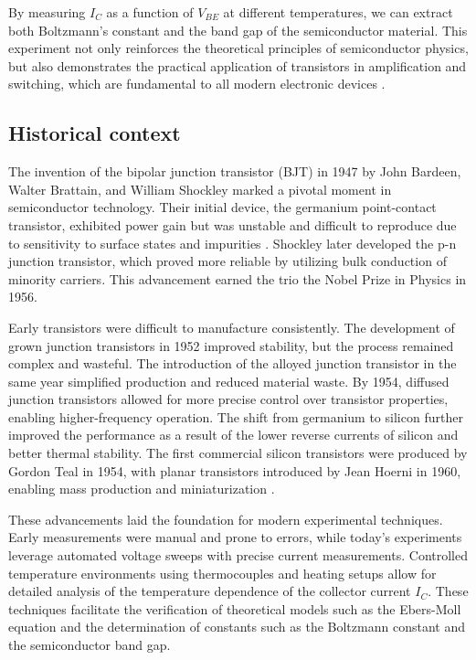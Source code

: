 \documentclass[12pt,letterpaper,twocolumn]{article}
\begin{document}
By measuring \( I_C \) as a function of \( V_{BE} \) at different temperatures, we can extract both Boltzmann’s constant and the band gap of the semiconductor material. This experiment not only reinforces the theoretical principles of semiconductor physics, but also demonstrates the practical application of transistors in amplification and switching, which are fundamental to all modern electronic devices \cite{Thornton}.


\subsection{Historical context}

The invention of the bipolar junction transistor (BJT) in 1947 by John Bardeen, Walter Brattain, and William Shockley marked a pivotal moment in semiconductor technology. Their initial device, the germanium point-contact transistor, exhibited power gain but was unstable and difficult to reproduce due to sensitivity to surface states and impurities \cite{Lukasiak}. Shockley later developed the p-n junction transistor, which proved more reliable by utilizing bulk conduction of minority carriers. This advancement earned the trio the Nobel Prize in Physics in 1956.

Early transistors were difficult to manufacture consistently. The development of grown junction transistors in 1952 improved stability, but the process remained complex and wasteful. The introduction of the alloyed junction transistor in the same year simplified production and reduced material waste. By 1954, diffused junction transistors allowed for more precise control over transistor properties, enabling higher-frequency operation. The shift from germanium to silicon further improved the performance as a result of the lower reverse currents of silicon and better thermal stability. The first commercial silicon transistors were produced by Gordon Teal in 1954, with planar transistors introduced by Jean Hoerni in 1960, enabling mass production and miniaturization \cite{Lukasiak}.

These advancements laid the foundation for modern experimental techniques. Early measurements were manual and prone to errors, while today's experiments leverage automated voltage sweeps with precise current measurements. Controlled temperature environments using thermocouples and heating setups allow for detailed analysis of the temperature dependence of the collector current \( I_C \). These techniques facilitate the verification of theoretical models such as the Ebers-Moll equation and the determination of constants such as the Boltzmann constant and the semiconductor band gap.
\end{document}
